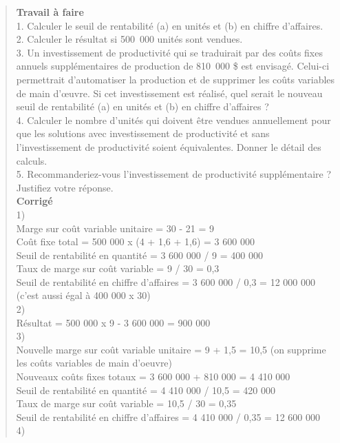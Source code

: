 \documentclass{tufte-handout}
\begin{document}
\begin{enumerate}
\begin{verse}
\textbf{Travail à faire}\\
1. Calculer le seuil de rentabilité (a) en unités et (b) en chiffre d’affaires.\\
2. Calculer le résultat si 500 000 unités sont vendues.\\
3. Un investissement de productivité qui se traduirait par des coûts fixes annuels supplémentaires de production de 810 000 \$ est envisagé. Celui-ci permettrait d’automatiser la production et de supprimer les coûts variables de main d’œuvre. Si cet investissement est réalisé, quel serait le nouveau seuil de rentabilité (a) en unités et (b) en chiffre d’affaires ?\\
4. Calculer le nombre d’unités qui doivent être vendues annuellement pour que les solutions avec investissement de productivité et sans l’investissement de productivité soient équivalentes. Donner le détail des calculs.\\
5. Recommanderiez-vous l’investissement de productivité supplémentaire ? Justifiez votre réponse.\\
\vspace*{1em}
\textbf{Corrigé}\\
1)\\
Marge sur coût variable unitaire = 30 - 21 = 9\\
Coût fixe total = 500 000 x (4 + 1,6 + 1,6) = 3 600 000\\
Seuil de rentabilité en quantité = 3 600 000 / 9 = 400 000\\
Taux de marge sur coût variable = 9 / 30 = 0,3\\
Seuil de rentabilité en chiffre d'affaires = 3 600 000 / 0,3 = 12 000 000 (c'est aussi égal à 400 000 x 30)\\
2)\\
Résultat = 500 000 x 9 - 3 600 000 = 900 000\\
3)\\
Nouvelle marge sur coût variable unitaire = 9 + 1,5 = 10,5 (on supprime les coûts variables de main d'oeuvre)\\
Nouveaux coûts fixes totaux = 3 600 000 + 810 000 = 4 410 000\\
Seuil de rentabilité en quantité = 4 410 000 / 10,5 = 420 000\\
Taux de marge sur coût variable = 10,5 / 30 = 0,35\\
Seuil de rentabilité en chiffre d'affaires = 4 410 000 / 0,35 = 12 600 000\\
4)\\

\end{verse}
\end{enumerate}
\end{document}
